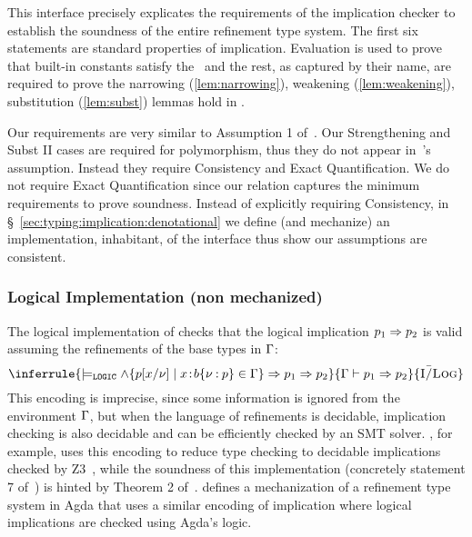 \noindent
This interface  precisely explicates
the requirements of
the implication checker 
to establish the soundness of the
entire refinement type system.
%
The first six statements are standard properties of implication. 
Evaluation is used to prove that built-in constants satisfy the~ 
and the rest, as captured by their name, are required to prove  
the narrowing (\ref{lem:narrowing}), weakening (\ref{lem:weakening}), 
substitution (\ref{lem:subst}) lemmas hold in \sysrf. 

Our requirements are very similar to Assumption 1 of~\cite{Knowles09}. 
Our Strengthening and Subst II cases are required for polymorphism, thus 
they do not appear in~\citet{Knowles09}'s assumption.  
Instead they require Consistency and Exact Quantification. 
We do not require Exact Quantification since our relation captures 
the minimum requirements to prove soundness. 
Instead of explicitly requiring Consistency, 
in \S~\ref{sec:typing:implication:denotational} we define (and mechanize) an implementation, \ie inhabitant, 
of the interface thus show our assumptions are consistent. 


\subsubsection{Logical Implementation (non mechanized)}
\label{sec:typing:implication:logical}
The logical implementation of 
checks that the logical implication $p_1 \Rightarrow p_2$
is valid assuming the refinements of the base types in $\mathrm{\Gamma}$:
%
$$
  \inferrule
  {\models_{\texttt{LOGIC}} \wedge\{ \subst{\spred}{\vv}{x} \mid \bind{x}{\breft{\sbase}{\vv}{\spred}} \in \tcenv \} \Rightarrow \spred_1 \Rightarrow \spred_2 }
  {\imply{\tcenv}{\spred_1}{\spred_2}}
  {\iLog}
$$
This encoding is imprecise, since some information is ignored from the environment $\mathrm{\Gamma}$, 
but when the language of refinements is decidable, implication checking 
is also decidable and can be efficiently checked by an SMT solver.
\lh, for example, uses this encoding to reduce type checking to decidable 
implications checked by Z3~\cite{z3}, while the soundness 
of this implementation (concretely statement 7 of~) 
is hinted by Theorem 2 of~\cite{Vazou14}.
\citet{10.1145/3546196.3550162} defines a mechanization of a 
refinement type system in Agda that uses a similar encoding of implication
where logical implications are checked using Agda's logic. 


